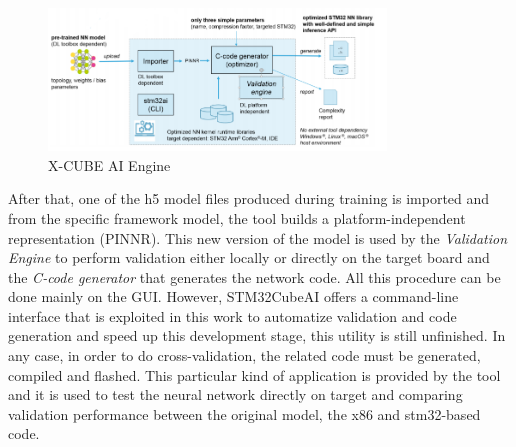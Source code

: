 \begin{figure}[H]
	\hfill\includegraphics[width=0.8\textwidth]{figures/stm32cubeai_arch.png}\hspace*{\fill}
	\caption{X-CUBE AI Engine}
\end{figure}

After that, one of the h5 model files produced during training is imported and from the specific framework model, the tool builds a platform-independent representation (PINNR).\newline 
This new version of the model is used by the \textit{Validation Engine} to perform validation either locally or directly on the target board and the \textit{C-code generator} that generates the network code. All this procedure can be done mainly on the GUI. However, STM32CubeAI offers a command-line interface that is exploited in this work to automatize validation and code generation and speed up this development stage, this utility is still unfinished.\newline
In any case, in order to do cross-validation, the related code must be generated, compiled and flashed. This particular kind of application is provided by the tool and it is used to test the neural network directly on target and comparing validation performance between the original model, the x86 and stm32-based code.
